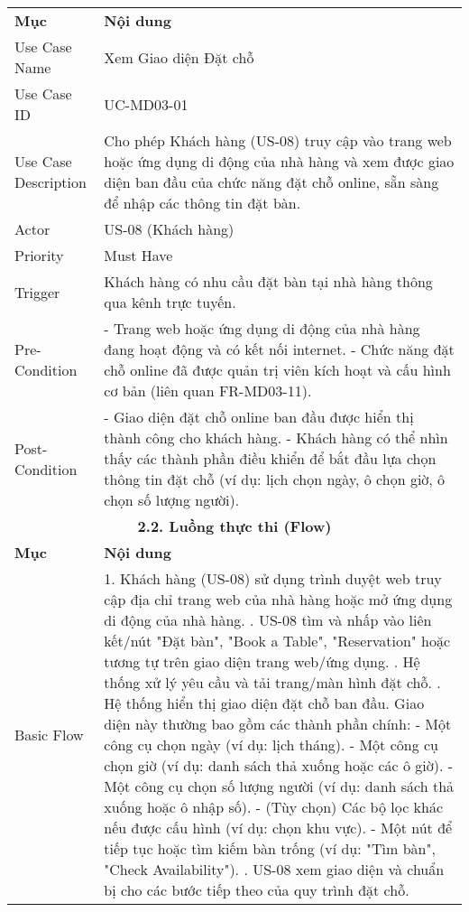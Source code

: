 \begin{longtable}{|m{4cm}|p{11cm}|}
\hline
\endlastfoot %
\multicolumn{2}{|c|}{\textbf{2.1. Tóm tắt (Summary)}} \\
\hline
\textbf{Mục} & \textbf{Nội dung} \\
\hline
Use Case Name & Xem Giao diện Đặt chỗ \\
\hline
Use Case ID & UC-MD03-01 \\
\hline
Use Case Description & Cho phép Khách hàng (US-08) truy cập vào trang web hoặc ứng dụng di động của nhà hàng và xem được giao diện ban đầu của chức năng đặt chỗ online, sẵn sàng để nhập các thông tin đặt bàn. \\
\hline
Actor & US-08 (Khách hàng) \\
\hline
Priority & Must Have \\
\hline
Trigger & Khách hàng có nhu cầu đặt bàn tại nhà hàng thông qua kênh trực tuyến. \\
\hline
Pre-Condition & - Trang web hoặc ứng dụng di động của nhà hàng đang hoạt động và có kết nối internet. \newline - Chức năng đặt chỗ online đã được quản trị viên kích hoạt và cấu hình cơ bản (liên quan FR-MD03-11). \\
\hline
Post-Condition & - Giao diện đặt chỗ online ban đầu được hiển thị thành công cho khách hàng. \newline - Khách hàng có thể nhìn thấy các thành phần điều khiển để bắt đầu lựa chọn thông tin đặt chỗ (ví dụ: lịch chọn ngày, ô chọn giờ, ô chọn số lượng người). \\
\hline
\multicolumn{2}{|c|}{\textbf{2.2. Luồng thực thi (Flow)}} \\
\hline
\textbf{Mục} & \textbf{Nội dung} \\
\hline
Basic Flow & 1. Khách hàng (US-08) sử dụng trình duyệt web truy cập địa chỉ trang web của nhà hàng hoặc mở ứng dụng di động của nhà hàng. \newline 2. US-08 tìm và nhấp vào liên kết/nút "Đặt bàn", "Book a Table", "Reservation" hoặc tương tự trên giao diện trang web/ứng dụng. \newline 3. Hệ thống xử lý yêu cầu và tải trang/màn hình đặt chỗ. \newline 4. Hệ thống hiển thị giao diện đặt chỗ ban đầu. Giao diện này thường bao gồm các thành phần chính: \newline    - Một công cụ chọn ngày (ví dụ: lịch tháng). \newline    - Một công cụ chọn giờ (ví dụ: danh sách thả xuống hoặc các ô giờ). \newline    - Một công cụ chọn số lượng người (ví dụ: danh sách thả xuống hoặc ô nhập số). \newline    - (Tùy chọn) Các bộ lọc khác nếu được cấu hình (ví dụ: chọn khu vực). \newline    - Một nút để tiếp tục hoặc tìm kiếm bàn trống (ví dụ: "Tìm bàn", "Check Availability"). \newline 5. US-08 xem giao diện và chuẩn bị cho các bước tiếp theo của quy trình đặt chỗ. \\

\end{longtable}
